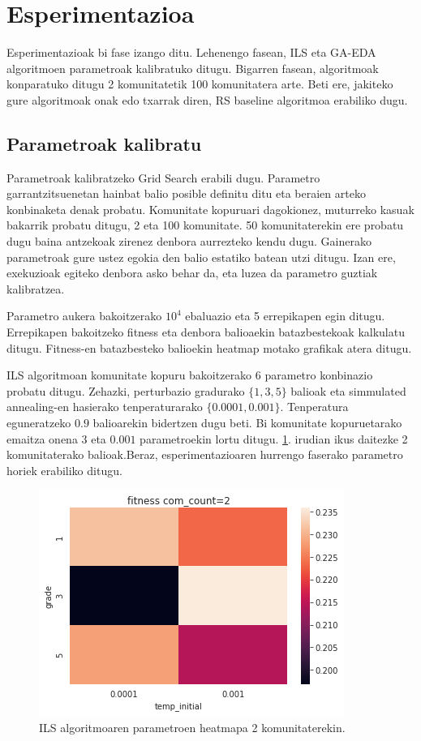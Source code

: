 \documentclass[sigconf]{acmart}
\begin{document}
\section{Esperimentazioa}

Esperimentazioak bi fase izango ditu. Lehenengo fasean, ILS eta GA-EDA algoritmoen parametroak kalibratuko ditugu. Bigarren fasean, algoritmoak konparatuko ditugu 2 komunitatetik 100 komunitatera arte. Beti ere, jakiteko gure algoritmoak onak edo txarrak diren, RS baseline algoritmoa erabiliko dugu.

\subsection{Parametroak kalibratu}
\label{espe}
Parametroak kalibratzeko Grid Search erabili dugu. Parametro garrantzitsuenetan hainbat balio posible definitu ditu eta beraien arteko konbinaketa denak probatu. Komunitate kopuruari dagokionez, muturreko kasuak bakarrik probatu ditugu, 2 eta 100 komunitate. 50 komunitaterekin ere probatu dugu baina antzekoak zirenez denbora aurrezteko kendu dugu. Gainerako parametroak gure ustez egokia den balio estatiko batean utzi ditugu. Izan ere, exekuzioak egiteko denbora asko behar da, eta luzea da parametro guztiak kalibratzea. 

Parametro aukera bakoitzerako $10^4$ ebaluazio eta 5 errepikapen egin ditugu. Errepikapen bakoitzeko fitness eta denbora balioaekin batazbestekoak kalkulatu ditugu. Fitness-en batazbesteko balioekin heatmap motako grafikak atera ditugu. 

ILS algoritmoan komunitate kopuru bakoitzerako 6 parametro konbinazio probatu ditugu. Zehazki, perturbazio gradurako $\{1, 3, 5\}$ balioak eta simmulated annealing-en hasierako tenperaturarako $\{0.0001, 0.001\}$. Tenperatura eguneratzeko $0.9$ balioarekin bidertzen dugu beti. Bi komunitate kopuruetarako emaitza onena $3$ eta $0.001$ parametroekin lortu ditugu. \ref{fig:heatmap}. irudian ikus daitezke 2 komunitaterako balioak.Beraz, esperimentazioaren hurrengo faserako parametro horiek erabiliko ditugu. 

\begin{figure}
    \centering
    \includegraphics[width=0.6\linewidth]{heatmap}
    \caption{ILS algoritmoaren parametroen heatmapa 2 komunitaterekin.}
    \label{fig:heatmap}
\end{figure}
\end{document}
